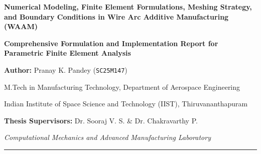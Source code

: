 \documentclass[10pt,a4paper]{article}
\begin{document}
\begin{center}
    {\LARGE\bfseries Numerical Modeling, Finite Element Formulations, Meshing Strategy, and Boundary Conditions in Wire Arc Additive Manufacturing (WAAM)\par}
    \vspace{0.6em}
    {\large\textbf{Comprehensive Formulation and Implementation Report for Parametric Finite Element Analysis}\par}
    \vspace{0.6em}
    {\normalsize\textbf{Author:} Pranay K. Pandey (\texttt{SC25M147})\par}
    {\small M.Tech in Manufacturing Technology, Department of Aerospace Engineering\par}
    {\small Indian Institute of Space Science and Technology (IIST), Thiruvananthapuram\par}
    \vspace{0.3em}
    {\small\textbf{Thesis Supervisors:} Dr. Sooraj V. S. \& Dr. Chakravarthy P.\par}
    \vspace{0.2em}
    {\small\textit{Computational Mechanics and Advanced Manufacturing Laboratory}\par}
\end{center}

\vspace{0.3em}
\hrule
\vspace{0.8em}

\begin{abstract}
\noindent Wire Arc Additive Manufacturing (WAAM) is a directed energy deposition technology characterized by transient, moving, high-energy electric arcs, rapid solidification cycles, cyclic reheat shocks, and severe residual stress accumulation. Developing a predictive, mathematically verifiable numerical model requires a rigorous continuum mechanics formulation coupled with robust spatial and temporal discretization strategies. This report documents the complete mathematical foundations of our open-source FreeFEM++ thermomechanical framework. First, all governing equations---transient heat conduction with apparent heat capacity latent heat absorption, the moving Goldak double-ellipsoid volumetric heat source, quasi-static mechanical equilibrium, additive elastoplastic strain decomposition, $J_2$ associative flow with radial return mapping, and microstructure solidification metrics (cooling rate $\dot{T}$ and Secondary Dendrite Arm Spacing $\lambda_2$)---are cataloged sequentially. Second, the parametric meshing strategy, volumetric locking alleviation, and the quiet element dynamic activation method are established. Third, the physical sizing rules for the volumetric heat source parameters based on bead morphology are detailed. Fourth, complete thermal and mechanical boundary condition matrices are tabulated across all external domain boundaries. Finally, comprehensive schematic diagrams illustrating the full 3D domain, single-bead morphology with heat source isotherms, and single finite element cell integration degrees of freedom are provided.
\end{abstract}
\end{document}
